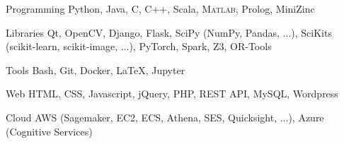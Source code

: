 

\begin{minipage}[]{0.4\textwidth}
  \vspace{2.0mm}

  \begin{cvskills}
    \cvskill
      {Programming}
      {Python, Java, C, C++, Scala, \textsc{Matlab}, Prolog, MiniZinc}

    \cvskill
      {Libraries}
      {Qt, OpenCV, Django, Flask, SciPy (NumPy, Pandas, ...), SciKits (scikit-learn, scikit-image, ...), PyTorch, Spark, Z3, OR-Tools}

    \cvskill
      {Tools}
      {Bash, Git, Docker, \LaTeX, Jupyter}

    \cvskill
      {Web}
      {HTML, CSS, Javascript, jQuery, PHP, REST API, MySQL, Wordpress}

    \cvskill
      {Cloud}
      {AWS (Sagemaker, EC2, ECS, Athena, SES, Quicksight, ...), Azure (Cognitive Services)}
  \end{cvskills}
\end{minipage}%
\begin{minipage}[]{0.6\textwidth}
  \hfill
\end{minipage}
\vspace{-2.0mm}


